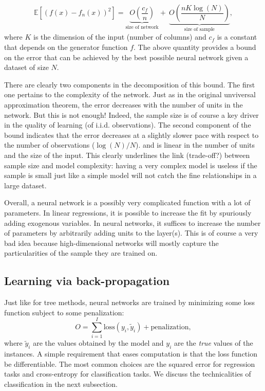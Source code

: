\documentclass[]{krantz}
\theoremstyle{definition}
\theoremstyle{definition}
\theoremstyle{definition}
\theoremstyle{remark}
\begin{document}
\begin{equation}
\label{eq:univapprox}
\mathbb{E}\left[(f(x)-f_n(x))^2 \right]=\underbrace{O\left(\frac{c_f}{n} \right)}_{\text{size of network}}+\ \underbrace{O\left(\frac{nK \log(N)}{N} \right)}_{\text{size of sample}},
\end{equation} where \(K\) is the dimension of the input (number of
columns) and \(c_f\) is a constant that depends on the generator
function \(f\). The above quantity provides a bound on the error that
can be achieved by the best possible neural network given a dataset of
size \(N\).

There are clearly two components in the decomposition of this bound. The
first one pertains to the complexity of the network. Just as in the
original unviversal approximation theorem, the error decreases with the
number of units in the network. But this is not enough! Indeed, the
sample size is of course a key driver in the quality of learning (of
i.i.d. observations). The second component of the bound indicates that
the error decreases at a slightly slower pace with respect to the number
of observations (\(\log(N)/N\)). and is linear in the number of units
and the size of the input. This clearly underlines the link (trade-off?)
between sample size and model complexity: having a very complex model is
useless if the sample is small just like a simple model will not catch
the fine relationships in a large dataset.

Overall, a neural network is a possibly very complicated function with a
lot of parameters. In linear regressions, it is possible to increase the
fit by spuriously adding exogenous variables. In neural networks, it
suffices to increase the number of parameters by arbitrarily adding
units to the layer(s). This is of course a very bad idea because
high-dimensional networks will mostly capture the particularities of the
sample they are trained on.

\hypertarget{backprop}{%
\subsection{Learning via back-propagation}\label{backprop}}

Just like for tree methods, neural networks are trained by minimizing
some loss function subject to some penalization:
\[O=\sum_{i=1}^I \text{loss}(y_i,\tilde{y}_i)+ \text{penalization},\]
where \(\tilde{y}_i\) are the values obtained by the model and \(y_i\)
are the \emph{true} values of the instances. A simple requirement that
eases computation is that the loss function be differentiable. The most
common choices are the squared error for regression tasks and
cross-entropy for classification tasks. We discuss the technicalities of
classification in the next subsection.
\end{document}
